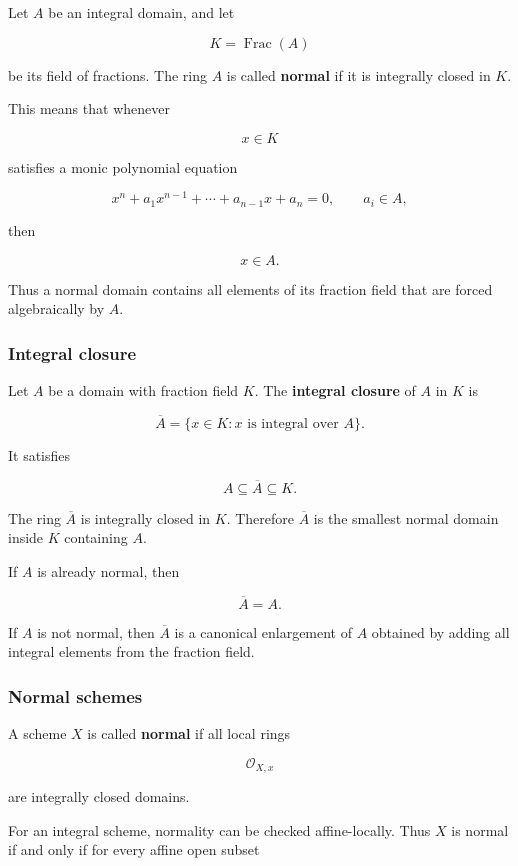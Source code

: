 \documentclass[12pt,a4paper]{article}
\theoremstyle{notespace}
\begin{document}
Let \(A\) be an integral domain, and let

\[
K=\operatorname{Frac}(A)
\]

be its field of fractions. The ring \(A\) is called \textbf{normal} if it is integrally closed in \(K\).

This means that whenever

\[
x\in K
\]

satisfies a monic polynomial equation

\[
x^n+a_1x^{n-1}+\cdots+a_{n-1}x+a_n=0,
\qquad a_i\in A,
\]

then

\[
x\in A.
\]

Thus a normal domain contains all elements of its fraction field that are forced algebraically by \(A\).

\subsubsection{Integral closure}

Let \(A\) be a domain with fraction field \(K\). The \textbf{integral closure} of \(A\) in \(K\) is

\[
\overline{A}
=
\{x\in K : x \text{ is integral over } A\}.
\]

It satisfies

\[
A\subseteq \overline{A}\subseteq K.
\]

The ring \(\overline{A}\) is integrally closed in \(K\). Therefore \(\overline{A}\) is the smallest normal domain inside \(K\) containing \(A\).

If \(A\) is already normal, then

\[
\overline{A}=A.
\]

If \(A\) is not normal, then \(\overline{A}\) is a canonical enlargement of \(A\) obtained by adding all integral elements from the fraction field.

\subsubsection{Normal schemes}

A scheme \(X\) is called \textbf{normal} if all local rings

\[
\mathcal{O}_{X,x}
\]

are integrally closed domains.

For an integral scheme, normality can be checked affine-locally. Thus \(X\) is normal if and only if for every affine open subset
\end{document}
